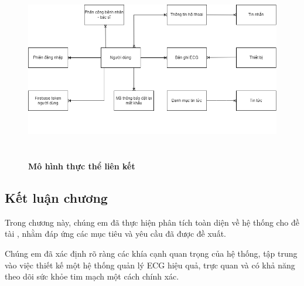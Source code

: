 \begin{figure}[H]
  \centering
  \includegraphics[width=15cm,height=8cm]{Images/system/fmECG_connection_entity.png}
  \caption[Mô hình thực thể liên kết]{\bfseries \fontsize{12pt}{0pt}
  \selectfont Mô hình thực thể liên kết}
  \label{ttlk} %
\end{figure}


\subsection{Kết luận chương}

Trong chương này, chúng em đã thực hiện phân tích toàn diện về
 hệ thống cho đề tài , nhằm đáp ứng
  các mục tiêu và yêu cầu đã được đề xuất.

Chúng em đã xác định rõ ràng các khía cạnh quan trọng của hệ thống,
 tập trung vào việc thiết kế một hệ thống quản lý ECG hiệu quả,
  trực quan và có khả năng theo dõi sức khỏe tim mạch một cách
   chính xác. 


\newpage
